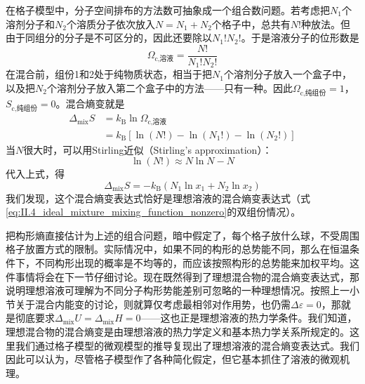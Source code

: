 \documentclass[main.tex]{subfiles}
\begin{document}
在格子模型中，分子空间排布的方法数可抽象成一个组合数问题。若考虑把$N_1$个溶剂分子和$N_2$个溶质分子依次放入$N=N_1+N_2$个格子中，总共有$N!$种放法。但由于同组分的分子是不可区分的，因此还要除以$N_1!N_2!$。于是溶液分子的位形数是
\begin{equation}
    \Omega_\text{c,溶液}=\frac{N!}{N_1!N_2!}
    \label{eq:III.1_omega_c_solution}
\end{equation}
在混合前，组份1和2处于纯物质状态，相当于把$N_1$个溶剂分子放入一个盒子中，以及把$N_2$个溶剂分子放入第二个盒子中的方法——只有一种。因此$\Omega_\text{c,纯组份}=1$，$S_\text{c,纯组份}=0$。混合熵变就是
\[\begin{aligned}
        \Delta_\text{mix}S & =k_\text{B}\ln\Omega_\text{c,溶液}                                                     \\
                           & =k_\text{B}\left[\ln\left(N!\right)-\ln\left(N_1!\right)-\ln\left(N_2!\right)\right]
    \end{aligned}\]
当$N$很大时，可以用Stirling近似（Stirling's approximation）：
\[\ln\left(N!\right)\approx N\ln N-N\]
代入上式，得
\begin{equation}\label{eq:III.1_mixing_entropy_regular_solution}
    \Delta_\text{mix}S=-k_\text{B}\left(N_1\ln x_1+N_2\ln x_2\right)
\end{equation}
我们发现，这个混合熵变表达式恰好是理想溶液的混合熵变表达式（式\eqref{eq:II.4_ideal_mixture_mixing_function_nonzero}的双组份情况）。

把构形熵直接估计为上述的组合问题，暗中假定了，每个格子放什么球，不受周围格子放置方式的限制。实际情况中，如果不同的构形的总势能不同，那么在恒温条件下，不同构形出现的概率是不均等的，而应该按照构形的总势能来加权平均。这件事情将会在下一节仔细讨论。现在既然得到了理想混合物的混合熵变表达式，那说明理想溶液可理解为不同分子构形势能差别可忽略的一种理想情况。按照上一小节关于混合内能变的讨论，则就算仅考虑最相邻对作用势，也仍需$\Delta\varepsilon=0$，那就是彻底要求$\Delta_\text{mix}U=\Delta_\text{mix}H=0$——这也正是理想溶液的热力学条件。我们知道，理想混合物的混合熵变是由理想溶液的热力学定义和基本热力学关系所规定的。这里我们通过格子模型的微观模型的推导复现出了理想溶液的混合熵变表达式。我们因此可以认为，尽管格子模型作了各种简化假定，但它基本抓住了溶液的微观机理。
\end{document}

